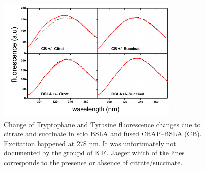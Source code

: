 \documentclass[english, a4paper, 12pt, titlepage, draft]{article}
\begin{document}
 

 

\begin{figure}
    \centering
    \includegraphics[width=0.8\textwidth]{figures/TyrTrp/TyrTrp_experiment.pdf}
    \caption{Change of Tryptophane and Tyrosine fluorescence changes due to citrate and succinate in solo BSLA and fused CitAP--BSLA (CB).
        Excitation happened at 278 nm.
        It was unfortunately not documented by the groupd of K.E. Jaeger which of the lines corresponds to the presence or absence of citrate/succinate.}
    \label{fig:TyrTrp_fluorescence}
\end{figure}        
\end{document}

